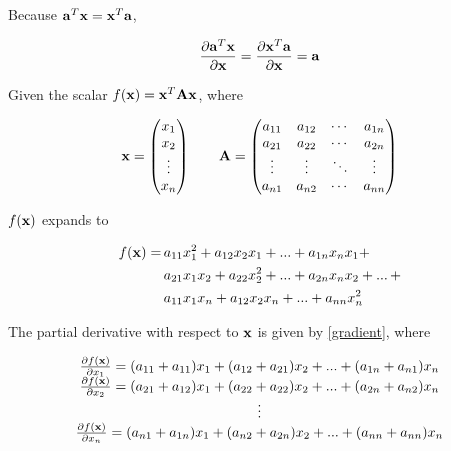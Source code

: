 \documentclass{article}
\newcommand{\vect}[1]{\textbf{\textrm{#1}}}
\newcommand{\pd}[2]{\frac{\partial {#1}}{\partial {#2}}}
\begin{document}
Because $\vect{a}^{T}\vect{x} = \vect{x}^{T}\vect{a}$,

\begin{equation} \label{scalargradvv}
	\pd{\vect{a}^{T}\vect{x}}{\vect{x}} = \pd{\vect{x}^{T}\vect{a}}{\vect{x}} = \vect{a} \\[2em]
\end{equation} 

Given the scalar $f(\vect{x}) = \vect{x}^{T}\vect{A}\vect{x}$, where

\begin{equation*}
	\vect{x}= 
	\begin{pmatrix}
		x_1 \\ 
		x_2 \\ 
		\vdots \\ 
		x_n
	\end{pmatrix}
	\qquad \vect{A} = 
	\begin{pmatrix}
		a_{11} & a_{12} & \cdots & a_{1n} \\
		a_{21} & a_{22} & \cdots & a_{2n} \\
		\vdots & \vdots & \ddots & \vdots \\
		a_{n1} & a_{n2} & \cdots & a_{nn}
	\end{pmatrix}
\end{equation*}

$f(\vect{x})$ expands to

\begin{align*}
	f(\vect{x}) = \, & a_{11}x_1^2 + a_{12}x_2x_1 + ... + a_{1n}x_nx_1 + \\
				  & a_{21}x_1x_2 + a_{22}x_2^2 + ... + a_{2n}x_nx_2 + ... \, + \\
				  & a_{11}x_1x_n + a_{12}x_2x_n + ... + a_{nn}x_n^2
\end{align*}

The partial derivative with respect to $\vect{x}$ is given by \eqref{gradient}, where

\begin{equation*}
	\begin{matrix}
		\pd{f(\vect{x})}{x_1} = (a_{11} + a_{11})x_1 + (a_{12} + a_{21})x_2 + ... + 
							   	(a_{1n} + a_{n1})x_n \\
		\pd{f(\vect{x})}{x_2} = (a_{21} + a_{12})x_1 + (a_{22} + a_{22})x_2 + ... + 
							   	(a_{2n} + a_{n2})x_n \\
		\vdots \\
		\pd{f(\vect{x})}{x_n} = (a_{n1} + a_{1n})x_1 + (a_{n2} + a_{2n})x_2 + ... + 
							   	(a_{nn} + a_{nn})x_n 
	\end{matrix}
\end{equation*}
\end{document}
